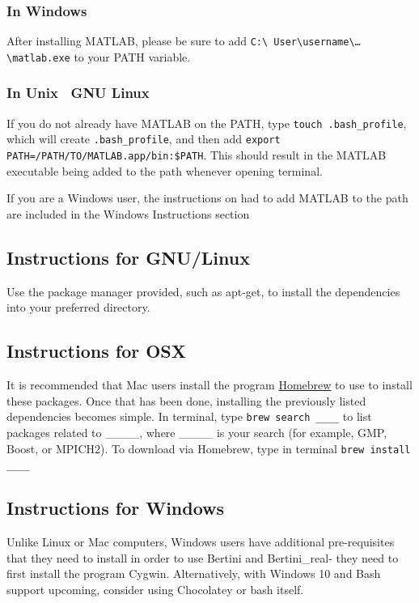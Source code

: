 \subsubsection*{In Windows}

After installing MATLAB, please be sure to add \texttt{C:\textbackslash{ User}\textbackslash{username}\textbackslash{\ldots}\textbackslash{matlab.exe}} to your PATH variable. 


\subsubsection*{In Unix \ GNU Linux}

If you do not already have MATLAB on the PATH, type \texttt{touch .bash\_profile}, which will create \texttt{.bash\_profile}, and then add \texttt{export PATH=/PATH/TO/MATLAB.app/bin:\$PATH}. This should result in the MATLAB executable being added to the path whenever opening terminal. 

If you are a Windows user, the instructions on had to add MATLAB to the \gls{path} are included in the Windows Instructions section


	\subsection{Instructions for GNU/Linux}

Use the package manager provided, such as apt-get, to install the dependencies into your preferred directory.

	\subsection{Instructions for OSX}

It is recommended that Mac users install the program \href{http://brew.sh}{Homebrew} to use to install these packages. Once that has been done, installing the previously listed dependencies becomes simple. In terminal,  type \texttt{brew search \_\_\_\_} to list packages related to \_\_\_\_, where \_\_\_\_ is your search (for example, GMP, Boost, or MPICH2). To download via Homebrew, type in terminal \texttt{brew install \_\_\_\_}
	




	\subsection{Instructions for Windows}
Unlike Linux or Mac computers, Windows users have additional pre-requisites that they need to install in order to use Bertini and Bertini\_real- they need to first install the program Cygwin.  Alternatively, with Windows 10 and Bash support upcoming, consider using Chocolatey or bash itself.

